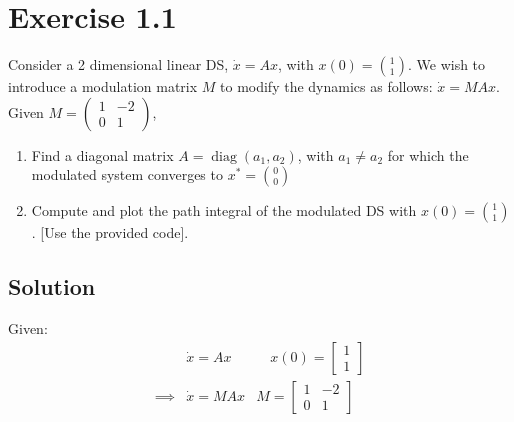 \section*{Exercise 1.1}

Consider a 2 dimensional linear DS, \( \dot{x}=A x \), with \( x(0)=\binom{1}{1} \).
We wish to introduce a modulation matrix \( M \) to modify the dynamics as follows: \( \dot{x}=M A x \).
Given \( M=\left(\begin{array}{cc}1 & -2 \\ 0 & 1\end{array}\right) \),
\begin{enumerate}[noitemsep]
    \item Find a diagonal matrix \( A=\operatorname{diag}\left(a_{1}, a_{2}\right) \), with \( a_{1} \neq a_{2} \) for which the modulated system converges to \( x^{*}=\binom{0}{0} \)
    \item Compute and plot the path integral of the modulated DS with \( x(0)=\binom{1}{1} \). [Use the provided code].
\end{enumerate}

\subsection*{Solution}

Given:
\begin{align*}
     &
    \dot x
    =
    A x
     &
    \quad
    x(0)
    =
    \begin{bmatrix}
        1 \\
        1
    \end{bmatrix}
    \\
    \implies
     &
    \dot x
    =
    M A x
     &
    M
    =
    \begin{bmatrix}
        1 & -2 \\
        0 & 1
    \end{bmatrix}
    \\
\end{align*}
